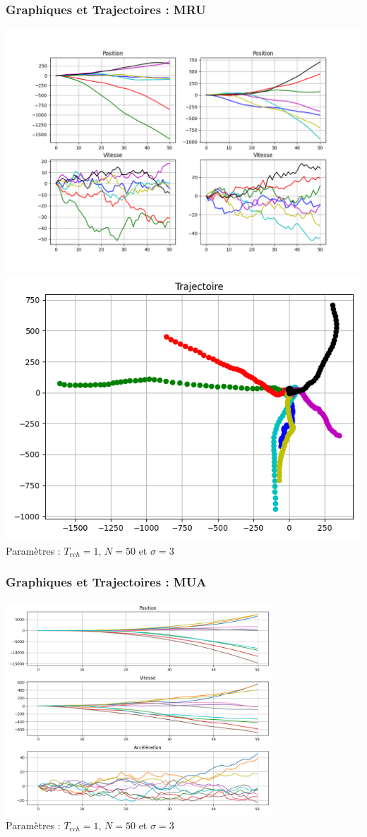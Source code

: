 \documentclass{beamer}
\begin{document}
\begin{frame}
  \frametitle{Graphiques et Trajectoires : MRU}
  \includegraphics[width=.65\textwidth]{images/MRU_Générations.png}\hfill
  \includegraphics[width=.35\textwidth]{images/MRU_Trajectoires.png} 
  Paramètres : $T_{ech} = 1$, $N = 50$ et $\sigma = 3$
\end{frame}

\begin{frame}
  \frametitle{Graphiques et Trajectoires : MUA}
  \includegraphics[width=0.75\textwidth]{images/MUA_Générations.png} \\
  Paramètres : $T_{ech} = 1$, $N = 50$ et $\sigma = 3$
\end{frame}
\end{document}
